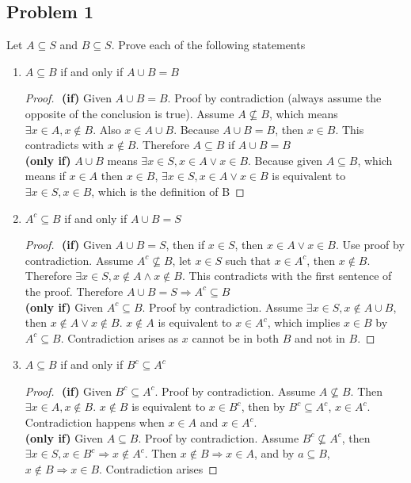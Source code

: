 \documentclass[11pt]{article}
\theoremstyle{plain}%
\theoremstyle{definition}
\theoremstyle{remark}
\begin{document}
\subsection*{Problem 1}
Let $A\subseteq S$ and $B\subseteq S$. Prove each of the following statements \\
\begin{enumerate}
  \item $A\subseteq B$ if and only if $A\cup B = B$
    \begin{proof}
      $ $\newline
      \textbf{(if)} Given $A\cup B = B$. Proof by contradiction (always assume the opposite of the conclusion is true). Assume $A\not\subseteq B$, which means $\exists x \in A, x \not\in B$. Also $x\in A\cup B$. Because $A\cup B = B$, then $x\in B$. This contradicts with $x\not\in B$. Therefore $A\subseteq B$ if $A\cup B = B$ \\
      \textbf{(only if)}  $A\cup B$ means $\exists x\in S, x\in A \lor x\in B$. Because given $A\subseteq B$, which means if $x\in A$ then $x\in B$, $\exists x\in S, x\in A \lor x\in B$ is equivalent to $\exists x\in S, x\in B$, which is the definition of B
    \end{proof}
  \item $A^{c}\subseteq B$ if and only if $A\cup B = S$
    \begin{proof}
      $ $\newline
      \textbf{(if)} Given $A\cup B = S$, then if $x\in S$, then $x\in A \lor x\in B$. Use proof by contradiction. Assume $A^{c}\not\subseteq B$, let $x \in S$ such that $x \in A^c$, then $x\not\in B$. Therefore $\exists x\in S, x\not\in A \land x\not\in B$. This contradicts with the first sentence of the proof. Therefore $A\cup B = S \Rightarrow A^{c}\subseteq B$ \\
      \textbf{(only if)} Given $A^{c}\subseteq B$. Proof by contradiction. Assume $\exists x \in S, x\not\in A\cup B$, then $x\not\in A \lor x\not\in B$. $x\not\in A$ is equivalent to $x\in A^{c}$, which implies $x\in B$ by $A^{c}\subseteq B$. Contradiction arises as $x$ cannot be in both $B$ and not in $B$.
    \end{proof}

  \item $A\subseteq B$ if and only if $B^{c}\subseteq A^{c}$
    \begin{proof}
      $ $\newline
      \textbf{(if)}
      Given $B^{c}\subseteq A^{c}$. Proof by contradiction. Assume $A \not\subseteq B$. Then $\exists x\in A, x \not\in B$. $x\not\in B$ is equivalent to $x\in B^c$, then by  $B^{c}\subseteq A^{c}$, $x \in A^c$. Contradiction happens when $x\in A$ and $x\in A^c$. \\
      \textbf{(only if)}
      Given $A\subseteq B$. Proof by contradiction. Assume $B^{c}\not\subseteq A^{c}$, then $\exists x\in S, x\in B^c \Rightarrow x\not\in A^c$. Then $x\not\in B \Rightarrow x\in A$, and by $a\subseteq B$, $x\not\in B \Rightarrow x\in B$. Contradiction arises
    \end{proof}


\end{enumerate}
\end{document}
